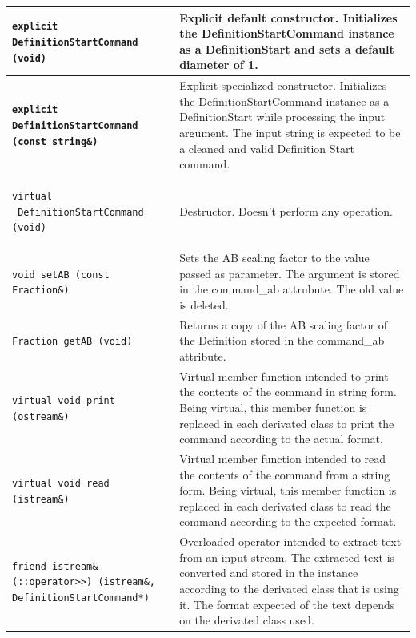 \documentclass[11pt,twoside,openany,x11names,svgnames]{memoir}
\begin{document}
\begin{table}[h]\footnotesize
\centering
\begin{tabular}{| >{\bfseries}p{7.5cm} | p{8cm} |}
	\hline
	
	\texttt{explicit DefinitionStartCommand (void)} & Explicit default constructor. Initializes the DefinitionStartCommand instance as a DefinitionStart and sets a default diameter of 1. \\
	
	\hline
	
	\texttt{explicit DefinitionStartCommand (const string\&)} & Explicit specialized constructor. Initializes the DefinitionStartCommand instance as a DefinitionStart while processing the input argument. The input string is expected to be a cleaned and valid Definition Start command. \\
	
	\hline
	
	\texttt{virtual ~DefinitionStartCommand (void)} & Destructor. Doesn't perform any operation. \\
	
	\hline
	
	\texttt{void setAB (const Fraction\&)} & Sets the AB scaling factor to the value passed as parameter. The argument is stored in the command\_ab attrubute. The old value is deleted. \\
	
	\hline	
	
	\texttt{Fraction getAB (void)} & Returns a copy of the AB scaling factor of the Definition stored in the command\_ab attribute. \\
		
	\hline
	
	\texttt{virtual void print (ostream\&)} & Virtual member function intended to print the contents of the command in string form. Being virtual, this member function is replaced in each derivated class to print the command according to the actual format. \\
	
	\hline
	
	\texttt{virtual void read (istream\&)} & Virtual member function intended to read the contents of the command from a string form. Being virtual, this member function is replaced in each derivated class to read the command according to the expected format. \\
	
	\hline	
		
	\texttt{friend istream\& (::operator>>) (istream\&, DefinitionStartCommand*)} & Overloaded operator intended to extract text from an input stream. The extracted text is converted and stored in the instance according to the derivated class that is using it. The format expected of the text depends on the derivated class used. \\
	

\end{tabular}
\end{table}
\end{document}
